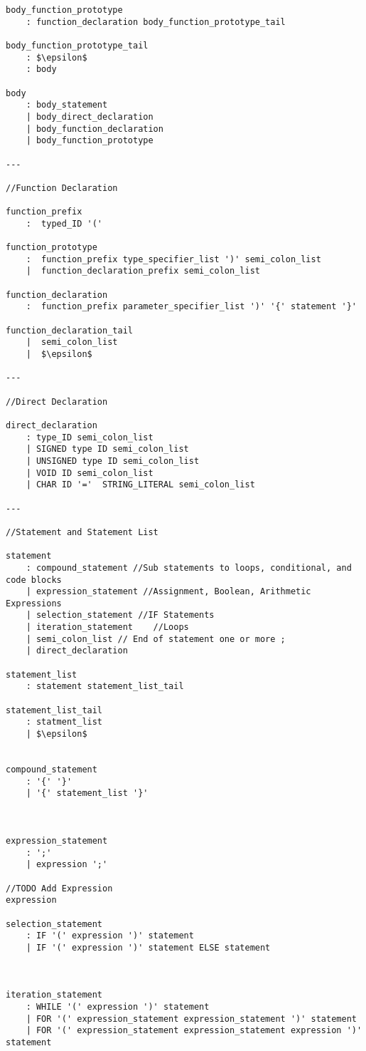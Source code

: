 \documentclass[12pt, letterpaper]{article}
\begin{document}
\begin{lstlisting}[mathescape=true]
body_function_prototype
	: function_declaration body_function_prototype_tail
	
body_function_prototype_tail
	: $\epsilon$ 
	: body

body
	: body_statement
	| body_direct_declaration
	| body_function_declaration
	| body_function_prototype

---

//Function Declaration

function_prefix
	:  typed_ID '('

function_prototype
	:  function_prefix type_specifier_list ')' semi_colon_list
	|  function_declaration_prefix semi_colon_list
	
function_declaration
	:  function_prefix parameter_specifier_list ')' '{' statement '}' 
	
function_declaration_tail
	|  semi_colon_list
	|  $\epsilon$ 

---

//Direct Declaration 

direct_declaration
	: type_ID semi_colon_list
	| SIGNED type ID semi_colon_list
	| UNSIGNED type ID semi_colon_list
	| VOID ID semi_colon_list 
	| CHAR ID '='  STRING_LITERAL semi_colon_list
	
---

//Statement and Statement List	
	
statement
	: compound_statement //Sub statements to loops, conditional, and code blocks
	| expression_statement //Assignment, Boolean, Arithmetic Expressions
	| selection_statement //IF Statements
	| iteration_statement	 //Loops
	| semi_colon_list // End of statement one or more ;
	| direct_declaration
			
statement_list
	: statement statement_list_tail

statement_list_tail
	: statment_list
	| $\epsilon$
	
	
compound_statement
	: '{' '}'
	| '{' statement_list '}'
	
	
	
expression_statement
	: ';'
	| expression ';'

//TODO Add Expression
expression	
	
selection_statement
	: IF '(' expression ')' statement
	| IF '(' expression ')' statement ELSE statement
	
	
	
iteration_statement
	: WHILE '(' expression ')' statement
	| FOR '(' expression_statement expression_statement ')' statement
	| FOR '(' expression_statement expression_statement expression ')' statement
	

	
	

\end{lstlisting}
\end{document}
